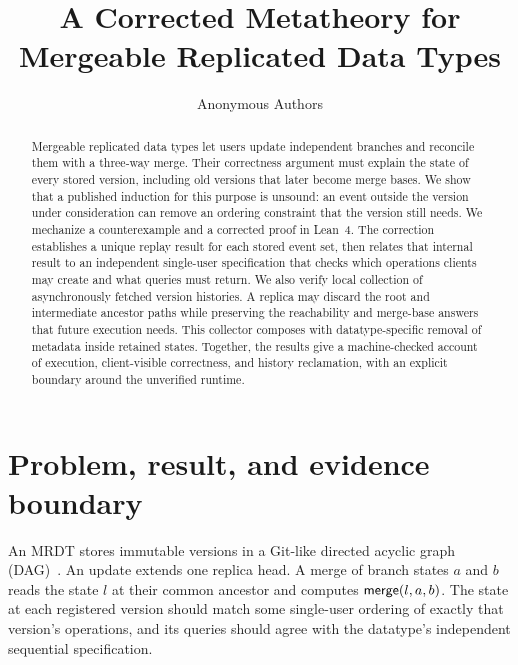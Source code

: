 

\title{A Corrected Metatheory for Mergeable Replicated Data Types}
\author{Anonymous Authors}
\date{}


\maketitle

\begin{abstract}
Mergeable replicated data types let users update independent branches and
reconcile them with a three-way merge. Their correctness argument must explain
the state of every stored version, including old versions that later become
merge bases. We show that a published induction for this purpose is unsound:
an event outside the version under consideration can remove an ordering
constraint that the version still needs. We mechanize a counterexample and a
corrected proof in Lean~4. The correction establishes a unique replay result
for each stored event set, then relates that internal result to an independent
single-user specification that checks which operations clients may create and
what queries must return. We also verify local collection of asynchronously
fetched version histories. A replica may discard the root and intermediate
ancestor paths while preserving the reachability and merge-base answers that
future execution needs. This collector composes with datatype-specific removal
of metadata inside retained states. Together, the results give a
machine-checked account of execution, client-visible correctness, and history
reclamation, with an explicit boundary around the unverified runtime.
\end{abstract}

\tableofcontents

\section{Problem, result, and evidence boundary}

An MRDT stores immutable versions in a Git-like directed acyclic graph
(DAG)~\cite{kaki2019mrdt}. An update extends one replica head. A merge of branch
states $a$ and $b$ reads the state $l$ at their common ancestor and computes
$\merge(l,a,b)$. The state at each registered version should match some
single-user ordering of exactly that version's operations, and its queries
should agree with the datatype's independent sequential specification.

